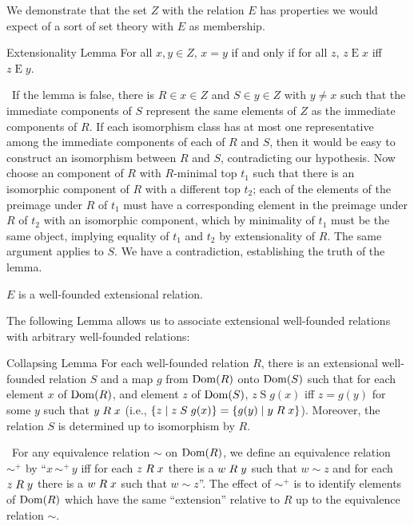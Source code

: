 We demonstrate that the set $Z$ with the relation $E$ has properties
we would expect of a sort of set theory with $E$ as
membership.

\begin{Thm}{Extensionality Lemma} 
  For all $x,y \in Z$, $x=y$ if and only
  if for all $z$, $z\mathrel{E} x$ iff $z\mathrel{E} y$.
\end{Thm}

\preuve\ If the lemma is false, there is
$R \in x \in Z$ and $S \in y \in Z$ with $y \neq x$ such that the
immediate components of $S$ represent the same elements of $Z$ as
the immediate components of $R$.  If each isomorphism class has at 
most one representative among the immediate components of each of
$R$ and $S$, then it would be easy to construct an isomorphism
between $R$ and $S$, contradicting our hypothesis.  Now choose an
component of $R$ with $R$-minimal top $t_1$ such that there is an
isomorphic component of $R$ with a different top $t_2$; each of the
elements of the preimage under $R$ of $t_1$ must have a
corresponding element in the preimage under $R$ of $t_2$ with an
isomorphic component, which by minimality of $t_1$ must be the same
object, implying equality of $t_1$ and $t_2$ by extensionality of
$R$.  The same argument applies to $S$.  We have a contradiction,
establishing the truth of the lemma.
\finpreuve

\begin{cor}
 $E$ is a well-founded extensional relation.
\end{cor}

The following Lemma allows us to associate extensional well-founded
relations with arbitrary well-founded relations:

\begin{Lemme}{Collapsing Lemma}
  For each well-founded relation $R$, there is
  an extensional well-founded relation $S$ and a map $g$ from $\mathop{\mathrm{Dom}}(R)$
  onto $\mathop{\mathrm{Dom}}(S)$ such that for each element $x$ of
  $\mathop{\mathrm{Dom}}(R)$, and element $z$ of $\mathop{\mathrm{Dom}}(S)$, $z\mathrel{S}g(x)$ iff $z=g(y)$ for
  some $y$ such that $y\mathrel{R} x$ (i.e., $\{z \mid z\mathrel{S} g(x)\} =
  \{g(y) \mid y\mathrel{R} x\}$).  Moreover, the relation $S$ is determined
  up to isomorphism by $R$.
\end{Lemme}

\preuve\ For any equivalence relation $\sim$ on $\mathop{\mathrm{Dom}}(R)$, we define an
equivalence relation $\sim^+$ by ``$x\, \sim^+\, y$ iff for each $z \mathrel{R} x$
there is a $w \mathrel{R} y$ such that $w \sim z$ and for each $z \mathrel{R} y$ there is a $w
\mathrel{R} x$ such that $w \sim z$''.  The effect of $\sim^+$ is to identify elements
of $\mathop{\mathrm{Dom}}(R)$ which have the same 
``extension'' relative to $R$ up to the equivalence relation $\sim$.

